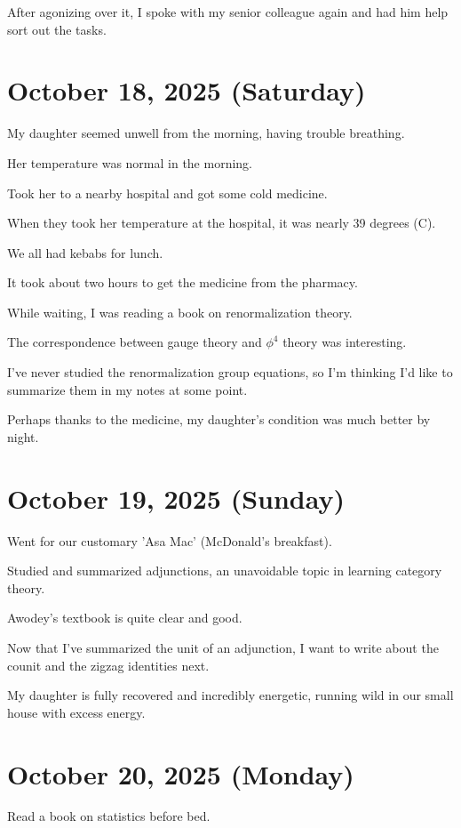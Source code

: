 \documentclass{article}
\begin{document}
After agonizing over it, I spoke with my senior colleague again and had him help sort out the tasks.

\section{October 18, 2025 (Saturday)}

My daughter seemed unwell from the morning, having trouble breathing.

Her temperature was normal in the morning.

Took her to a nearby hospital and got some cold medicine.

When they took her temperature at the hospital, it was nearly 39 degrees (C).

We all had kebabs for lunch.

It took about two hours to get the medicine from the pharmacy.

While waiting, I was reading a book on renormalization theory.

The correspondence between gauge theory and $\phi^{4}$ theory was interesting.

I've never studied the renormalization group equations, so I'm thinking I'd like to summarize them in my notes at some point.

Perhaps thanks to the medicine, my daughter's condition was much better by night.

\section{October 19, 2025 (Sunday)}

Went for our customary 'Asa Mac' (McDonald's breakfast).

Studied and summarized adjunctions, an unavoidable topic in learning category theory.

Awodey's textbook is quite clear and good.

Now that I've summarized the unit of an adjunction, I want to write about the counit and the zigzag identities next.

My daughter is fully recovered and incredibly energetic, running wild in our small house with excess energy.

\section{October 20, 2025 (Monday)}

Read a book on statistics before bed.
\end{document}
